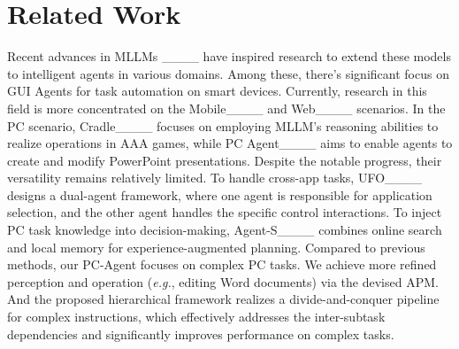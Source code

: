 \section{Related Work}
Recent advances in MLLMs ____ have 
inspired research to extend these models to intelligent agents in various domains.
Among these, there's significant focus on GUI Agents for task automation on smart devices.
Currently, research in this field is more concentrated on the Mobile____ and Web____ scenarios. In the PC scenario, Cradle____ focuses on employing MLLM's reasoning abilities to realize operations in AAA games, while PC Agent____ aims to enable agents to create and modify PowerPoint presentations.
Despite the notable progress, their versatility remains relatively limited.
% 
To handle cross-app tasks, UFO____ designs a dual-agent framework, where one agent is responsible for application selection, and the other agent handles the specific control interactions.
To inject PC task knowledge into decision-making, 
Agent-S____ combines online search and local memory for experience-augmented planning.
% 
Compared to previous methods, our PC-Agent focuses on complex PC tasks.
We achieve more refined perception and operation (\textit{e.g.}, editing Word documents) via the devised APM.
And the proposed hierarchical framework realizes a divide-and-conquer pipeline for complex instructions, which effectively addresses the inter-subtask dependencies and significantly improves performance on complex tasks.